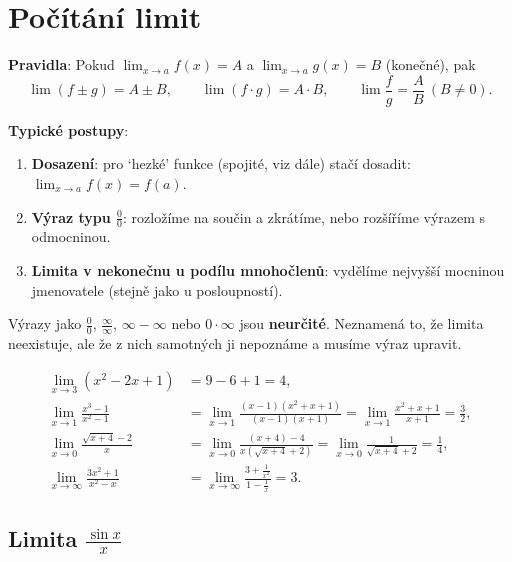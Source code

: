\section{Počítání limit}\label{sec:pocitani-limit}

\begin{definitionbox}
  \textbf{Pravidla}: Pokud $\lim_{x\to a} f(x) = A$ a $\lim_{x\to a} g(x) = B$ (konečné), pak
  \begin{equation*}
    \lim(f\pm g) = A\pm B,\qquad\lim(f\cdot g) = A\cdot B,\qquad\lim\frac{f}{g} = \frac{A}{B}\ (B\neq 0).
  \end{equation*}

  \textbf{Typické postupy}:
  \begin{enumerate}
    \item \textbf{Dosazení}: pro `hezké' funkce (spojité, viz dále) stačí dosadit: $\lim_{x\to a} f(x) = f(a)$.
    \item \textbf{Výraz typu $\frac{0}{0}$}: rozložíme na součin a zkrátíme, nebo rozšíříme výrazem s odmocninou.
    \item \textbf{Limita v nekonečnu u podílu mnohočlenů}: vydělíme nejvyšší mocninou jmenovatele (stejně jako u posloupností).
  \end{enumerate}
  Výrazy jako $\frac{0}{0}$, $\frac{\infty}{\infty}$, $\infty - \infty$ nebo $0\cdot\infty$ jsou \textbf{neurčité}. Neznamená to, že limita neexistuje, ale že z nich samotných ji nepoznáme a musíme výraz upravit.
\end{definitionbox}

\begin{example}
  \begin{align*}
    \lim_{x\to 3}(x^2 - 2x + 1) &= 9 - 6 + 1 = 4,\\
    \lim_{x\to 1}\frac{x^3 - 1}{x^2 - 1} &= \lim_{x\to 1}\frac{(x - 1)(x^2 + x + 1)}{(x - 1)(x + 1)} = \lim_{x\to 1}\frac{x^2 + x + 1}{x + 1} = \frac{3}{2},\\
    \lim_{x\to 0}\frac{\sqrt{x + 4} - 2}{x} &= \lim_{x\to 0}\frac{(x + 4) - 4}{x(\sqrt{x + 4} + 2)} = \lim_{x\to 0}\frac{1}{\sqrt{x + 4} + 2} = \frac{1}{4},\\
    \lim_{x\to\infty}\frac{3x^2 + 1}{x^2 - x} &= \lim_{x\to\infty}\frac{3 + \frac{1}{x^2}}{1 - \frac{1}{x}} = 3.
  \end{align*}
\end{example}

\subsection{Limita $\frac{\sin x}{x}$}\label{sec:limita-sinx-x}

